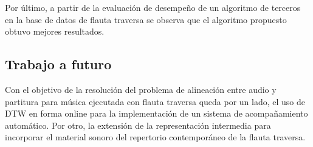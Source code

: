 \documentclass
  [ams,pdfout]%
	{aeslac}
\begin{document}
Por último, a partir de la evaluación de desempeño de un algoritmo de terceros en la base de datos de flauta traversa se observa que el algoritmo propuesto obtuvo mejores resultados.


\subsection{Trabajo a futuro}

Con el objetivo de la resolución del problema de alineación entre audio y partitura para música ejecutada con flauta traversa queda por un lado, el uso de DTW en forma online para la implementación de un sistema de acompañamiento automático. Por otro, la extensión de la representación intermedia para incorporar el material sonoro del repertorio contemporáneo de la flauta traversa. 
%
%
%
\end{document}
